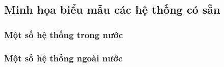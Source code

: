 \subsection{Minh họa biểu mẫu các hệ thống có sẵn}
\setcounter{subsection}{3}
\setcounter{figure}{0}

\subsubsection{Một số hệ thống trong nước}


\subsubsection{Một số hệ thống ngoài nước}